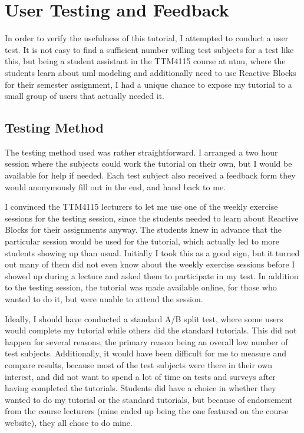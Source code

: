 \section{User Testing and Feedback}
\label{sec:tutorial_testing}
In order to verify the usefulness of this tutorial, I attempted to conduct a user test. It is not easy to find a sufficient number willing test subjects for a test like this, but being a student assistant in the TTM4115 course at \gls{ntnu}, where the students learn about \gls{uml} modeling and additionally need to use Reactive Blocks for their semester assignment, I had a unique chance to expose my tutorial to a small group of users that actually needed it.

\subsection{Testing Method}
\label{sec:tutorial_testing_method}
The testing method used was rather straightforward. I arranged a two hour session where the subjects could work the tutorial on their own, but I would be available for help if needed. Each test subject also received a feedback form they would anonymously fill out in the end, and hand back to me.

\noindent
I convinced the TTM4115 lecturers to let me use one of the weekly exercise sessions for the testing session, since the students needed to learn about Reactive Blocks for their assignments anyway. The students knew in advance that the particular session would be used for the tutorial, which actually led to more students showing up than usual. Initially I took this as a good sign, but it turned out many of them did not even know about the weekly exercise sessions before I showed up during a lecture and asked them to participate in my test. In addition to the testing session, the tutorial was made available online, for those who wanted to do it, but were unable to attend the session.

\noindent
Ideally, I should have conducted a standard A/B split test, where some users would complete my tutorial while others did the standard tutorials. This did not happen for several reasons, the primary reason being an overall low number of test subjects. Additionally, it would have been difficult for me to measure and compare results, because most of the test subjects were there in their own interest, and did not want to spend a lot of time on tests and surveys after having completed the tutorials. Students did have a choice in whether they wanted to do my tutorial or the standard tutorials, but because of endorsement from the course lecturers (mine ended up being the one featured on the course website), they all chose to do mine.


